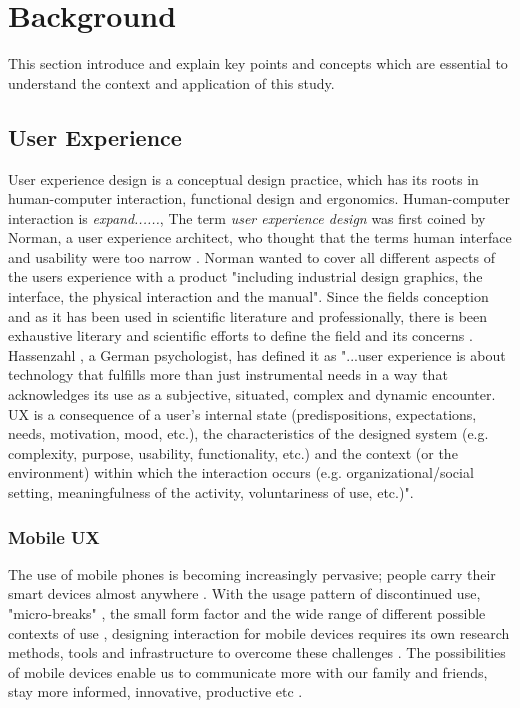 \chapter{Background}
\label{chap:background}
This section introduce and explain key points and concepts which are essential to understand the context and application of this study.

\section{User Experience}
User experience design is a conceptual design practice, which has its roots in human-computer interaction, functional design and ergonomics. Human-computer interaction is \textit{expand......}, The term \textit{user experience design} was first coined by Norman, a user experience architect, who thought that the terms human interface and usability were too narrow \cite{Merholz2008}. Norman wanted to cover all different aspects of the users experience with a product "including industrial design graphics, the interface, the physical interaction and the manual". Since the fields conception and as it has been used in scientific literature and professionally, there is been exhaustive literary and scientific efforts to define the field and its concerns \cite{Law2008} \cite{Law2009} \cite{Forlizzi2000}. Hassenzahl \cite{Hassenzahl2006}, a German psychologist, has defined it as "...user experience is about technology that fulfills more than just instrumental needs in a way that acknowledges its use as a subjective, situated, complex and dynamic encounter. UX is a consequence of a user’s internal state (predispositions, expectations, needs, motivation, mood, etc.), the characteristics of the designed system (e.g. complexity, purpose, usability, functionality, etc.) and the context (or the environment) within which the interaction occurs (e.g. organizational/social setting, meaningfulness of the activity, voluntariness of use, etc.)".

\subsection{Mobile UX}
The use of mobile phones is becoming increasingly pervasive; people carry their smart devices almost anywhere \cite{Mallat2004}. With the usage pattern of discontinued use, "micro-breaks" \cite{McGregor2014a}, the small form factor and the wide range of different possible contexts of use \cite{Wang2016}, designing interaction for mobile devices requires its own research methods, tools and infrastructure to overcome these challenges \cite{Nakhimovsky2009}. The possibilities of mobile devices enable us to communicate more with our family and friends, stay more informed, innovative, productive etc \cite{Wang2016}.

